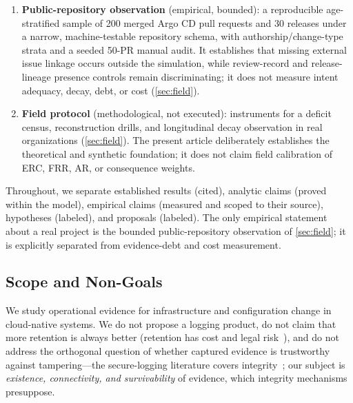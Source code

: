 \begin{enumerate}[label=\textbf{C\arabic*.},leftmargin=2.2em,itemsep=1.5pt,topsep=2pt]
$\ED_\rho(t)$ under a declared workload (\cref{sec:simulation}). The study
validates that the constructs are computable and discriminating; it estimates no
real-world magnitudes.
\item \textbf{Public-repository observation} (empirical, bounded): a reproducible
age-stratified sample of 200 merged Argo CD pull requests and 30 releases under a
narrow, machine-testable repository schema, with authorship/change-type strata and
a seeded 50-PR manual audit. It establishes that missing external issue linkage
occurs outside the simulation, while review-record and release-lineage presence
controls remain discriminating; it does not measure intent adequacy, decay, debt,
or cost (\cref{sec:field}).
\item \textbf{Field protocol} (methodological, not executed): instruments for a
deficit census, reconstruction drills, and longitudinal decay observation in real
organizations (\cref{sec:field}). The present article deliberately establishes the
theoretical and synthetic foundation; it does not claim field calibration of ERC,
FRR, AR, or consequence weights.
\end{enumerate}

Throughout, we separate established results (cited), analytic claims (proved within
the model), empirical claims (measured and scoped to their source), hypotheses
(labeled), and proposals (labeled). The only empirical statement about a real
project is the bounded public-repository observation of \cref{sec:field}; it is
explicitly separated from evidence-debt and cost measurement.

\subsection{Scope and Non-Goals}

We study operational evidence for infrastructure and configuration change in
cloud-native systems. We do not propose a logging product, do not claim that more
retention is always better (retention has cost and legal risk~\cite{gdpr,nist80092}),
and do not address the orthogonal question of whether captured evidence is
trustworthy against tampering---the secure-logging literature covers
integrity~\cite{schneier1999,crosby2009,haber1991}; our subject is \emph{existence,
connectivity, and survivability} of evidence, which integrity mechanisms presuppose.
